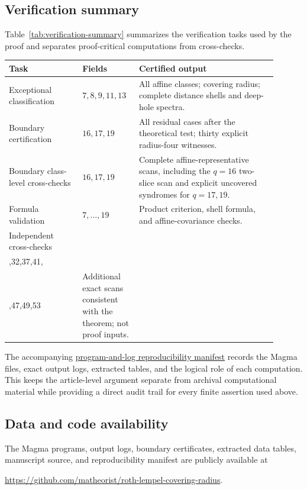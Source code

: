 ﻿\documentclass[11pt]{article}
\theoremstyle{plain}
\theoremstyle{definition}
\begin{document}
\subsection*{Verification summary}
Table~\ref{tab:verification-summary} summarizes the verification tasks used
by the proof and separates proof-critical computations from cross-checks.
\begin{center}
\label{tab:verification-summary}
\small
\begin{tabular}{>{\raggedright\arraybackslash}p{0.25\linewidth}
                >{\raggedright\arraybackslash}p{0.18\linewidth}
                >{\raggedright\arraybackslash}p{0.47\linewidth}}
\toprule
Task & Fields & Certified output\\
\midrule
Exceptional classification &
\(7,8,9,11,13\) &
All affine classes; covering radius; complete distance shells and
deep-hole spectra.\\
Boundary certification &
\(16,17,19\) &
All residual cases after the theoretical test; thirty explicit
radius-four witnesses.\\
Boundary class-level cross-checks &
\(16,17,19\) &
Complete affine-representative scans, including the \(q=16\) two-slice
scan and explicit uncovered syndromes for \(q=17,19\).\\
Formula validation &
\(7,\ldots,19\) &
Product criterion, shell formula, and affine-covariance checks.\\
Independent cross-checks &
\(\begin{gathered}23,25,27,29,\\
31,32,37,41,\\
43,47,49,53\end{gathered}\) &
Additional exact scans consistent with the theorem; not proof inputs.\\
\bottomrule
\end{tabular}
\end{center}

The accompanying
\href{https://github.com/matheorist/roth-lempel-covering-radius/blob/main/%
paper/reproducibility.md}
{program-and-log reproducibility manifest} records the
Magma files, exact output logs, extracted tables, and the logical role of
each computation.  This keeps the article-level argument separate from
archival computational material while providing a direct audit trail for
every finite assertion used above.

\subsection*{Data and code availability}
The Magma programs, output logs, boundary certificates, extracted data
tables, manuscript source, and reproducibility manifest are publicly
available at
\begin{center}
\url{https://github.com/matheorist/roth-lempel-covering-radius}.
\end{center}
\end{document}
